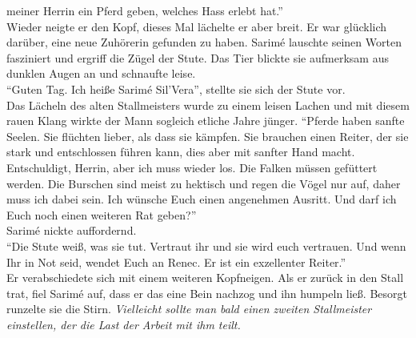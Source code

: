 meiner Herrin ein Pferd geben, welches Hass erlebt hat.''\\
Wieder neigte er den Kopf, dieses Mal lächelte er aber breit. Er war glücklich darüber, eine neue 
Zuhörerin gefunden zu haben. Sarimé lauschte seinen Worten fasziniert und ergriff die Zügel der 
Stute. Das Tier blickte sie aufmerksam aus dunklen Augen an und schnaufte leise. \\
``Guten Tag. Ich heiße Sarimé Sil'Vera'', stellte sie sich der Stute vor. \\
Das Lächeln des alten Stallmeisters wurde zu einem leisen Lachen und mit diesem rauen Klang wirkte 
der Mann sogleich etliche Jahre jünger. ``Pferde haben sanfte Seelen. Sie flüchten lieber, als 
dass sie kämpfen. Sie brauchen einen Reiter, der sie stark und entschlossen führen kann, dies aber 
mit sanfter Hand macht. Entschuldigt, Herrin, aber ich muss wieder los. Die Falken müssen gefüttert 
werden. Die Burschen sind meist zu hektisch und regen die Vögel nur auf, daher muss ich dabei sein. 
Ich wünsche Euch einen angenehmen Ausritt. Und darf ich Euch noch einen weiteren Rat geben?''\\
Sarimé nickte auffordernd.\\
``Die Stute weiß, was sie tut. Vertraut ihr und sie wird euch vertrauen. Und wenn Ihr in Not seid, 
wendet Euch an Renec. Er ist ein exzellenter Reiter.''\\
Er verabschiedete sich mit einem weiteren Kopfneigen. Als er zurück in den Stall trat, fiel Sarimé 
auf, dass er das eine Bein nachzog und ihn humpeln ließ. Besorgt runzelte sie die Stirn. 
\textit{Vielleicht sollte man bald einen zweiten Stallmeister einstellen, der die Last der Arbeit 
mit ihm teilt.}\\

